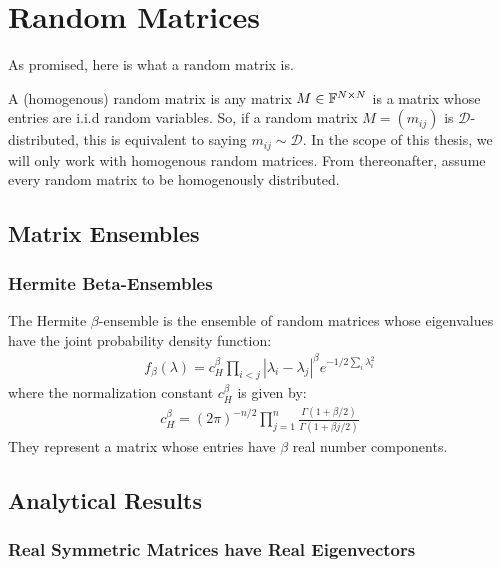 \chapter{Random Matrices}

As promised, here is what a random matrix is.

\begin{definition}
A (homogenous) random matrix is any matrix $M \in \mathbb{F}^{N \times N}$ is a matrix whose entries are i.i.d random variables. So, if a random matrix $M = (m_{ij})$ is $\mathcal{D}$-distributed, this is equivalent to saying $m_{ij} \sim \mathcal{D}$. In the scope of this thesis, we will only work with homogenous random matrices. From thereonafter, assume every random matrix to be homogenously distributed. 
\end{definition}

\section{Matrix Ensembles}
\subsection{Hermite Beta-Ensembles}

\begin{definition}
The Hermite $\beta$-ensemble is the ensemble of random matrices whose eigenvalues have the joint probability density function:
\begin{align*}
f_\beta(\lambda) = c_H^\beta \prod_{i < j} |\lambda_i - \lambda_j|^\beta e^{-1/2\sum_i \lambda_i^2}
\end{align*}
where the normalization constant $c_H^\beta$ is given by:
\begin{align*}
c_H^\beta = (2\pi)^{-n/2} \prod_{j = 1}^n \frac{\Gamma(1 + \beta/2)}{\Gamma(1 + \beta j/2)}
\end{align*}
They represent a matrix whose entries have $\beta$ real number components.
\end{definition}

\section{Analytical Results}
\subsection{Real Symmetric Matrices have Real Eigenvectors}

